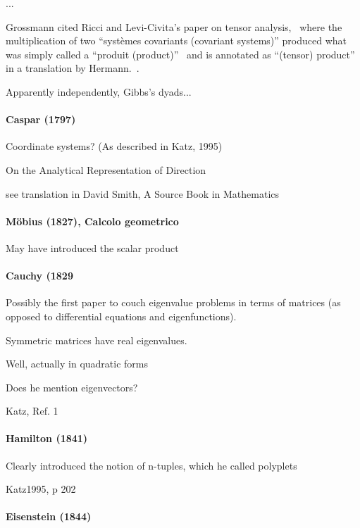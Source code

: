 ...

Grossmann cited Ricci and Levi-Civita's paper on tensor analysis,~\cite{Ricci1900} where the multiplication of two ``systèmes covariants (covariant systems)'' produced what was simply called a ``produit (product)''~\cite[p. 133]{Ricci1900} and is annotated as ``(tensor) product'' in a translation by Hermann.~\cite[p. 28]{Hermann1975}.

Apparently independently, Gibbs's dyads...



\paragraph{Caspar (1797)}

Coordinate systems? (As described in Katz, 1995)

On the Analytical Representation of Direction

see translation in David Smith, A Source Book in Mathematics

\paragraph{Möbius (1827), Calcolo geometrico}

May have introduced the scalar product



\paragraph{Cauchy (1829}

Possibly the first paper to couch eigenvalue problems in terms of matrices (as
opposed to differential equations and eigenfunctions). 

Symmetric matrices have real eigenvalues.

Well, actually in quadratic forms

Does he mention eigenvectors?

Katz, Ref. 1

\paragraph{Hamilton (1841)}

Clearly introduced the notion of n-tuples, which he called polyplets


Katz1995, p 202



\paragraph{Eisenstein (1844)~\cite{Eisenstein1844}}

